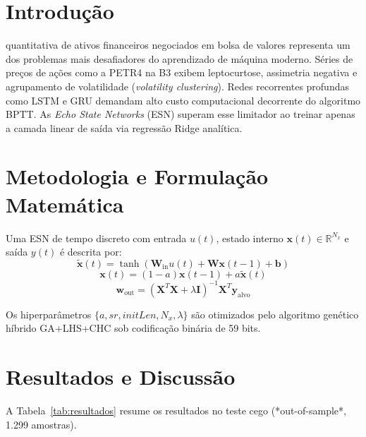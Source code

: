 \documentclass[10pt,journal,compsoc]{IEEEtran}
\begin{document}
\maketitle
\IEEEdisplaynontitleabstractindextext
\IEEEpeerreviewmaketitle

\section{Introdução}
 quantitativa de ativos financeiros negociados em bolsa de valores representa um dos problemas mais desafiadores do aprendizado de máquina moderno. Séries de preços de ações como a PETR4 na B3 exibem leptocurtose, assimetria negativa e agrupamento de volatilidade (\textit{volatility clustering}). Redes recorrentes profundas como LSTM e GRU demandam alto custo computacional decorrente do algoritmo BPTT. As \textit{Echo State Networks} (ESN) superam esse limitador ao treinar apenas a camada linear de saída via regressão Ridge analítica.

\section{Metodologia e Formulação Matemática}
Uma ESN de tempo discreto com entrada $u(t)$, estado interno $\mathbf{x}(t) \in \mathbb{R}^{N_x}$ e saída $y(t)$ é descrita por:
\begin{equation}
\mathbf{\tilde{x}}(t) = \tanh \left( \mathbf{W}_{\text{in}} u(t) + \mathbf{W} \mathbf{x}(t-1) + \mathbf{b} \right)
\end{equation}
\begin{equation}
\mathbf{x}(t) = (1 - a) \mathbf{x}(t-1) + a \mathbf{\tilde{x}}(t)
\end{equation}
\begin{equation}
\mathbf{w}_{\text{out}} = \left( \mathbf{X}^T \mathbf{X} + \lambda \mathbf{I} \right)^{-1} \mathbf{X}^T \mathbf{y}_{\text{alvo}}
\end{equation}

Os hiperparâmetros $\{a, sr, initLen, N_x, \lambda\}$ são otimizados pelo algoritmo genético híbrido GA+LHS+CHC sob codificação binária de 59 bits.

\section{Resultados e Discussão}
A Tabela~\ref{tab:resultados} resume os resultados no teste cego (*out-of-sample*, 1.299 amostras).
\end{document}
